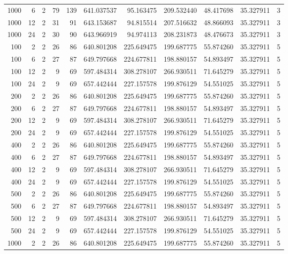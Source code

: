 \begin{table}
\begin{tabular}{rrrrrrrrrrr}
1000 & 6 & 2 & 79 & 139 & 641.037537 & 95.163475 & 209.532440 & 48.417698 & 35.327911 & 3 \\
1000 & 12 & 2 & 31 & 91 & 643.153687 & 94.815514 & 207.516632 & 48.866093 & 35.327911 & 3 \\
1000 & 24 & 2 & 30 & 90 & 643.966919 & 94.974113 & 208.231873 & 48.476673 & 35.327911 & 3 \\
100 & 2 & 2 & 26 & 86 & 640.801208 & 225.649475 & 199.687775 & 55.874260 & 35.327911 & 5 \\
100 & 6 & 2 & 27 & 87 & 649.797668 & 224.677811 & 198.880157 & 54.893497 & 35.327911 & 5 \\
100 & 12 & 2 & 9 & 69 & 597.484314 & 308.278107 & 266.930511 & 71.645279 & 35.327911 & 5 \\
100 & 24 & 2 & 9 & 69 & 657.442444 & 227.157578 & 199.876129 & 54.551025 & 35.327911 & 5 \\
200 & 2 & 2 & 26 & 86 & 640.801208 & 225.649475 & 199.687775 & 55.874260 & 35.327911 & 5 \\
200 & 6 & 2 & 27 & 87 & 649.797668 & 224.677811 & 198.880157 & 54.893497 & 35.327911 & 5 \\
200 & 12 & 2 & 9 & 69 & 597.484314 & 308.278107 & 266.930511 & 71.645279 & 35.327911 & 5 \\
200 & 24 & 2 & 9 & 69 & 657.442444 & 227.157578 & 199.876129 & 54.551025 & 35.327911 & 5 \\
400 & 2 & 2 & 26 & 86 & 640.801208 & 225.649475 & 199.687775 & 55.874260 & 35.327911 & 5 \\
400 & 6 & 2 & 27 & 87 & 649.797668 & 224.677811 & 198.880157 & 54.893497 & 35.327911 & 5 \\
400 & 12 & 2 & 9 & 69 & 597.484314 & 308.278107 & 266.930511 & 71.645279 & 35.327911 & 5 \\
400 & 24 & 2 & 9 & 69 & 657.442444 & 227.157578 & 199.876129 & 54.551025 & 35.327911 & 5 \\
500 & 2 & 2 & 26 & 86 & 640.801208 & 225.649475 & 199.687775 & 55.874260 & 35.327911 & 5 \\
500 & 6 & 2 & 27 & 87 & 649.797668 & 224.677811 & 198.880157 & 54.893497 & 35.327911 & 5 \\
500 & 12 & 2 & 9 & 69 & 597.484314 & 308.278107 & 266.930511 & 71.645279 & 35.327911 & 5 \\
500 & 24 & 2 & 9 & 69 & 657.442444 & 227.157578 & 199.876129 & 54.551025 & 35.327911 & 5 \\
1000 & 2 & 2 & 26 & 86 & 640.801208 & 225.649475 & 199.687775 & 55.874260 & 35.327911 & 5 \\

\end{tabular}
\end{table}
